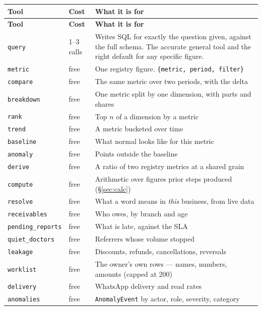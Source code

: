 \documentclass[11pt,a4paper]{report}
\newcommand{\code}[1]{\texttt{\small #1}}
\begin{document}
\begin{center}
\small
\begin{longtable}{@{}p{2.6cm}p{1.5cm}p{10.3cm}@{}}
\toprule
\textbf{Tool} & \textbf{Cost} & \textbf{What it is for}\\
\midrule
\endfirsthead
\toprule
\textbf{Tool} & \textbf{Cost} & \textbf{What it is for}\\
\midrule
\endhead
\code{query} & 1--3 calls & Writes SQL for exactly the question given, against the full schema. The
 accurate general tool and the right default for any specific figure.\\
\code{metric} & free & One registry figure. \code{\{metric, period, filter\}}\\
\code{compare} & free & The same metric over two periods, with the delta\\
\code{breakdown} & free & One metric split by one dimension, with parts and shares\\
\code{rank} & free & Top $n$ of a dimension by a metric\\
\code{trend} & free & A metric bucketed over time\\
\code{baseline} & free & What normal looks like for this metric\\
\code{anomaly} & free & Points outside the baseline\\
\code{derive} & free & A ratio of two registry metrics at a shared grain\\
\code{compute} & free & Arithmetic over figures prior steps produced (\S\ref{sec:calc})\\
\code{resolve} & free & What a word means in \emph{this} business, from live data\\
\code{receivables} & free & Who owes, by branch and age\\
\code{pending\_reports} & free & What is late, against the SLA\\
\code{quiet\_doctors} & free & Referrers whose volume stopped\\
\code{leakage} & free & Discounts, refunds, cancellations, reversals\\
\code{worklist} & free & The owner's own rows --- names, numbers, amounts (capped at 200)\\
\code{delivery} & free & WhatsApp delivery and read rates\\
\code{anomalies} & free & \code{AnomalyEvent} by actor, role, severity, category\\
\bottomrule
\end{longtable}
\end{center}
\end{document}
